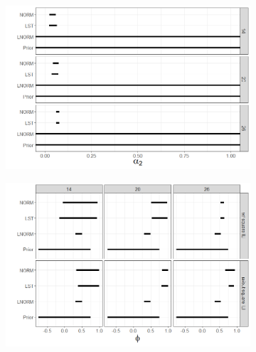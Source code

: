 \documentclass{article}
\begin{document}
\begin{figure}[hbt!]
\medskip %
\begin{subfigure}{.475\linewidth}
  \includegraphics[width=\linewidth]{../../Images/alpha2_post.png}
\end{subfigure}\hfill %
\begin{subfigure}{.475\linewidth}
  \includegraphics[width=\linewidth]{../../Images/phi_post.png}
\end{subfigure}


\end{figure}
\end{document}
